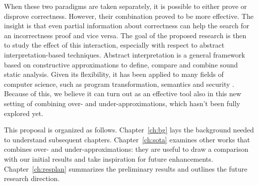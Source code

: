 When these two paradigms are taken separately, it is possible to either prove or disprove correctness. However, their combination proved to be more effective. The insight is that even partial information about correctness can help the search for an incorrectness proof and vice versa. The goal of the proposed research is then to study the effect of this interaction, especially with respect to abstract interpretation-based techniques.
Abstract interpretation \cite{CC77,RY20} is a general framework based on constructive approximations to define, compare and combine sound static analysis. Given its flexibility, it has been applied to many fields of computer science, such as program transformation, semantics and security \cite{CC14}. Because of this, we believe it can turn out as an effective tool also in this new setting of combining over- and under-approximations, which hasn't been fully explored yet.

This proposal is organized as follows. Chapter~\ref{ch:bg} lays the background needed to understand subsequent chapters. Chapter~\ref{ch:sota} examines other works that combines over- and under-approximations: they are useful to draw a comparison with our initial results and take inspiration for future enhancements. Chapter~\ref{ch:resplan} summarizes the preliminary results and outlines the future research direction.

